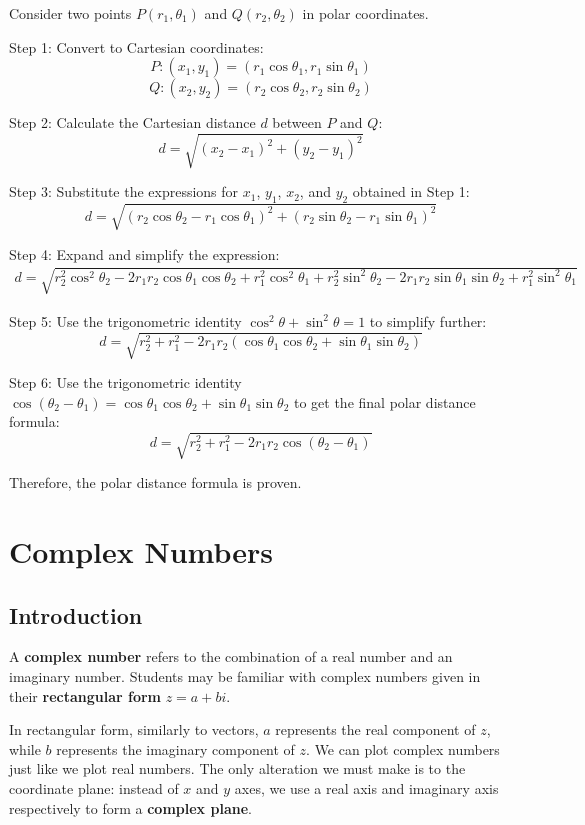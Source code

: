 \documentclass[11pt]{article}
\begin{document}
Consider two points \(P(r_1, \theta_1)\) and \(Q(r_2, \theta_2)\) in polar coordinates.

Step 1: Convert to Cartesian coordinates:
\[
P: (x_1, y_1) = (r_1 \cos \theta_1, r_1 \sin \theta_1)
\]
\[
Q: (x_2, y_2) = (r_2 \cos \theta_2, r_2 \sin \theta_2)
\]

Step 2: Calculate the Cartesian distance \(d\) between \(P\) and \(Q\):
\[
d = \sqrt{(x_2 - x_1)^2 + (y_2 - y_1)^2}
\]

Step 3: Substitute the expressions for \(x_1\), \(y_1\), \(x_2\), and \(y_2\) obtained in Step 1:
\[
d = \sqrt{(r_2 \cos \theta_2 - r_1 \cos \theta_1)^2 + (r_2 \sin \theta_2 - r_1 \sin \theta_1)^2}
\]

Step 4: Expand and simplify the expression:
\begin{align*}
    d = \sqrt{r_2^2 \cos^2 \theta_2 - 2r_1r_2 \cos \theta_1 \cos \theta_2 + r_1^2 \cos^2 \theta_1 + r_2^2 \sin^2 \theta_2 - 2r_1r_2 \sin \theta_1 \sin \theta_2 + r_1^2 \sin^2 \theta_1}
\end{align*}

Step 5: Use the trigonometric identity \(\cos^2 \theta + \sin^2 \theta = 1\) to simplify further:
\[
d = \sqrt{r_2^2 + r_1^2 - 2r_1r_2(\cos \theta_1 \cos \theta_2 + \sin \theta_1 \sin \theta_2)}
\]

Step 6: Use the trigonometric identity \(\cos(\theta_2 - \theta_1) = \cos \theta_1 \cos \theta_2 + \sin \theta_1 \sin \theta_2\) to get the final polar distance formula:
\[
d = \sqrt{r_2^2 + r_1^2 - 2r_1r_2 \cos(\theta_2 - \theta_1)}
\]

Therefore, the polar distance formula is proven.

\section{Complex Numbers}

\subsection{Introduction}

A \textbf{complex number} refers to the combination of a real number and an imaginary number. Students may be familiar with complex numbers given in their \textbf{rectangular form} $z = a+bi$. 

In rectangular form, similarly to vectors, $a$ represents the real component of $z$, while $b$ represents the imaginary component of $z$. We can plot complex numbers just like we plot real numbers. The only alteration we must make is to the coordinate plane: instead of $x$ and $y$ axes, we use a real axis and imaginary axis respectively to form a \textbf{complex plane}. 
\end{document}
